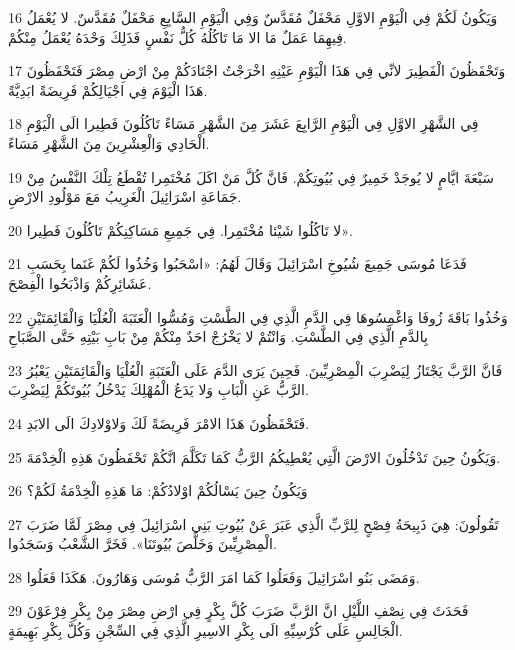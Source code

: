 \par 16 وَيَكُونُ لَكُمْ فِي الْيَوْمِ الاوَّلِ مَحْفَلٌ مُقَدَّسٌ وَفِي الْيَوْمِ السَّابِعِ مَحْفَلٌ مُقَدَّسٌ. لا يُعْمَلُ فِيهِمَا عَمَلٌ مَا الا مَا تَاكُلُهُ كُلُّ نَفْسٍ فَذَلِكَ وَحْدَهُ يُعْمَلُ مِنْكُمْ.
\par 17 وَتَحْفَظُونَ الْفَطِيرَ لانِّي فِي هَذَا الْيَوْمِ عَيْنِهِ اخْرَجْتُ اجْنَادَكُمْ مِنْ ارْضِ مِصْرَ فَتَحْفَظُونَ هَذَا الْيَوْمَ فِي اجْيَالِكُمْ فَرِيضَةً ابَدِيَّةً.
\par 18 فِي الشَّهْرِ الاوَّلِ فِي الْيَوْمِ الرَّابِعَ عَشَرَ مِنَ الشَّهْرِ مَسَاءً تَاكُلُونَ فَطِيرا الَى الْيَوْمِ الْحَادِي وَالْعِشْرِينَ مِنَ الشَّهْرِ مَسَاءً.
\par 19 سَبْعَةَ ايَّامٍ لا يُوجَدْ خَمِيرٌ فِي بُيُوتِكُمْ. فَانَّ كُلَّ مَنْ اكَلَ مُخْتَمِرا تُقْطَعُ تِلْكَ النَّفْسُ مِنْ جَمَاعَةِ اسْرَائِيلَ الْغَرِيبُ مَعَ مَوْلُودِ الارْضِ.
\par 20 لا تَاكُلُوا شَيْئا مُخْتَمِرا. فِي جَمِيعِ مَسَاكِنِكُمْ تَاكُلُونَ فَطِيرا».
\par 21 فَدَعَا مُوسَى جَمِيعَ شُيُوخِ اسْرَائِيلَ وَقَالَ لَهُمُ: «اسْحَبُوا وَخُذُوا لَكُمْ غَنَما بِحَسَبِ عَشَائِرِكُمْ وَاذْبَحُوا الْفِصْحَ.
\par 22 وَخُذُوا بَاقَةَ زُوفَا وَاغْمِسُوهَا فِي الدَّمِ الَّذِي فِي الطَّسْتِ وَمُسُّوا الْعَتَبَةَ الْعُلْيَا وَالْقَائِمَتَيْنِ بِالدَّمِ الَّذِي فِي الطَّسْتِ. وَانْتُمْ لا يَخْرُجْ احَدٌ مِنْكُمْ مِنْ بَابِ بَيْتِهِ حَتَّى الصَّبَاحِ
\par 23 فَانَّ الرَّبَّ يَجْتَازُ لِيَضْرِبَ الْمِصْرِيِّينَ. فَحِينَ يَرَى الدَّمَ عَلَى الْعَتَبَةِ الْعُلْيَا وَالْقَائِمَتَيْنِ يَعْبُرُ الرَّبُّ عَنِ الْبَابِ وَلا يَدَعُ الْمُهْلِكَ يَدْخُلُ بُيُوتَكُمْ لِيَضْرِبَ.
\par 24 فَتَحْفَظُونَ هَذَا الامْرَ فَرِيضَةً لَكَ وَلاوْلادِكَ الَى الابَدِ.
\par 25 وَيَكُونُ حِينَ تَدْخُلُونَ الارْضَ الَّتِي يُعْطِيكُمُ الرَّبُّ كَمَا تَكَلَّمَ انَّكُمْ تَحْفَظُونَ هَذِهِ الْخِدْمَةَ.
\par 26 وَيَكُونُ حِينَ يَسْالُكُمْ اوْلادُكُمْ: مَا هَذِهِ الْخِدْمَةُ لَكُمْ؟
\par 27 تَقُولُونَ: هِيَ ذَبِيحَةُ فِصْحٍ لِلرَّبِّ الَّذِي عَبَرَ عَنْ بُيُوتِ بَنِي اسْرَائِيلَ فِي مِصْرَ لَمَّا ضَرَبَ الْمِصْرِيِّينَ وَخَلَّصَ بُيُوتَنَا». فَخَرَّ الشَّعْبُ وَسَجَدُوا.
\par 28 وَمَضَى بَنُو اسْرَائِيلَ وَفَعَلُوا كَمَا امَرَ الرَّبُّ مُوسَى وَهَارُونَ. هَكَذَا فَعَلُوا.
\par 29 فَحَدَثَ فِي نِصْفِ اللَّيْلِ انَّ الرَّبَّ ضَرَبَ كُلَّ بِكْرٍ فِي ارْضِ مِصْرَ مِنْ بِكْرِ فِرْعَوْنَ الْجَالِسِ عَلَى كُرْسِيِّهِ الَى بِكْرِ الاسِيرِ الَّذِي فِي السِّجْنِ وَكُلَّ بِكْرِ بَهِيمَةٍ.
